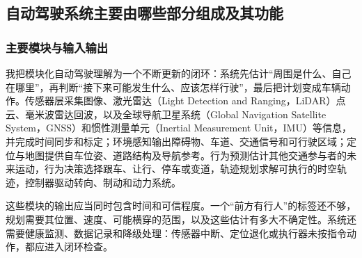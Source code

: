 \documentclass[UTF8,zihao=-4,fontset=windows]{ctexart}
\begin{document}
\subsection{自动驾驶系统主要由哪些部分组成及其功能}
\subsubsection{主要模块与输入输出}
我把模块化自动驾驶理解为一个不断更新的闭环：系统先估计“周围是什么、自己在哪里”，再判断“接下来可能发生什么、应该怎样行驶”，最后把计划变成车辆动作。传感器层采集图像、激光雷达（Light Detection and Ranging，LiDAR）点云、毫米波雷达回波，以及全球导航卫星系统（Global Navigation Satellite System，GNSS）和惯性测量单元（Inertial Measurement Unit，IMU）等信息，并完成时间同步和标定；环境感知输出障碍物、车道、交通信号和可行驶区域；定位与地图提供自车位姿、道路结构及导航参考。行为预测估计其他交通参与者的未来运动，行为决策选择跟车、让行、停车或变道，轨迹规划求解可执行的时空轨迹，控制器驱动转向、制动和动力系统。

这些模块的输出应当同时包含时间和可信程度。一个“前方有行人”的标签还不够，规划需要其位置、速度、可能横穿的范围，以及这些估计有多大不确定性。系统还需要健康监测、数据记录和降级处理：传感器中断、定位退化或执行器未按指令动作，都应进入闭环检查。
\end{document}
